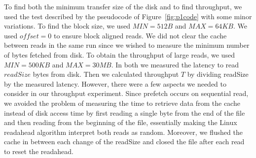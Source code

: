 To find both the minimum transfer size of the disk and to find throughput, we used 
the test described by the pseudocode of Figure~\ref{fig:p1code} with some minor 
variations. To find the block size, we used $MIN = 512B$ and $MAX = 64KB$. 
We used $offset=0$ to ensure block aligned reads. We did not clear the cache
between reads in the same run since we wished to measure the minimum number of bytes
fetched from disk. To obtain the throughput of large reads, we used $MIN = 500KB$ and
$MAX = 30MB$. In both we measured the latency to read $readSize$ bytes from disk.
Then we calculated throughput $T$ by dividing readSize by the measured latency. 
However, there were a few aspects we needed to consider in our throughput experiment. 
Since prefetch occurs on sequential read, we avoided the problem of measuring the 
time to retrieve data from the cache instead of disk access time by first reading 
a single byte from the end of the file and then reading from the beginning of the file, 
essentially making the Linux readahead algorithm interpret both reads as random. 
Moreover, we flushed the cache in between each change of the readSize and closed
the file after each read to reset the readahead.


